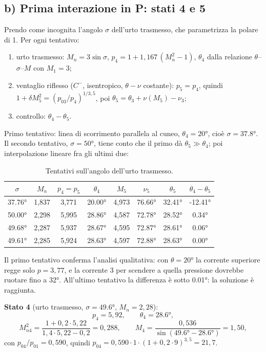 \documentclass[11pt,a4paper]{article}
\newcommand{\Cm}{C^{-}}
\begin{document}
\subsection*{b) Prima interazione in P: stati 4 e 5}
Prendo come incognita l'angolo $\sigma$ dell'urto trasmesso, che parametrizza la polare di 1. Per ogni tentativo:
\begin{enumerate}
\item urto trasmesso: $M_n=3\sin\sigma$, $p_4=1+1{,}167\,(M_n^2-1)$, $\theta_4$ dalla relazione
  $\theta$--$\sigma$--$M$ con $M_1=3$;
\item ventaglio riflesso ($\Cm$, isentropico, $\theta-\nu$ costante): $p_5=p_4$, quindi
  $1+\delta M_5^2=(p_{03}/p_4)^{1/3{,}5}$, poi $\theta_5=\theta_3+\nu(M_5)-\nu_3$;
\item controllo: $\theta_4-\theta_5$.
\end{enumerate}
Primo tentativo: linea di scorrimento parallela al cuneo, $\theta_4=\ang{20}$, cioè $\sigma=\ang{37.8}$. Il secondo
tentativo, $\sigma=\ang{50}$, tiene conto che il primo dà $\theta_5\gg\theta_4$; poi interpolazione lineare fra gli
ultimi due:
\begin{table}[H]
  \centering
  \small
  \begin{tabular}{cccccccc}
    \toprule
    $\sigma$ & $M_n$ & $p_4=p_5$ & $\theta_4$ & $M_5$ & $\nu_5$ & $\theta_5$ & $\theta_4-\theta_5$ \\
    \midrule
    \ang{37.76} & 1,837 & 3,771 & \ang{20.00} & 4,973 & \ang{76.66} & \ang{32.41} & \ang{-12.41} \\
    \ang{50.00} & 2,298 & 5,995 & \ang{28.86} & 4,587 & \ang{72.78} & \ang{28.52} & \ang{+0.34} \\
    \ang{49.68} & 2,287 & 5,937 & \ang{28.67} & 4,595 & \ang{72.87} & \ang{28.61} & \ang{+0.06} \\
    \ang{49.61} & 2,285 & 5,924 & \ang{28.63} & 4,597 & \ang{72.88} & \ang{28.63} & \ang{0.00} \\
    \bottomrule
  \end{tabular}
  \caption{Tentativi sull'angolo dell'urto trasmesso.}
\end{table}
Il primo tentativo conferma l'analisi qualitativa: con $\theta=\ang{20}$ la corrente superiore regge solo $p=3{,}77$,
e la corrente 3 per scendere a quella pressione dovrebbe ruotare fino a \ang{32}. All'ultimo tentativo la differenza
è sotto \ang{0.01}: la soluzione è raggiunta.

\textbf{Stato 4} (urto trasmesso, $\sigma=\ang{49.6}$, $M_n=2{,}28$):
\[
p_4=5{,}92,\qquad \theta_4=\ang{28.6},
\]
\[
M_{n4}^2=\frac{1+0{,}2\cdot5{,}22}{1{,}4\cdot5{,}22-0{,}2}=0{,}288,\qquad
M_4=\frac{0{,}536}{\sin(\ang{49.6}-\ang{28.6})}=1{,}50,
\]
con $p_{04}/p_{01}=0{,}590$, quindi $p_{04}=0{,}590\cdot1\cdot(1+0{,}2\cdot9)^{3{,}5}=21{,}7$.
\end{document}
